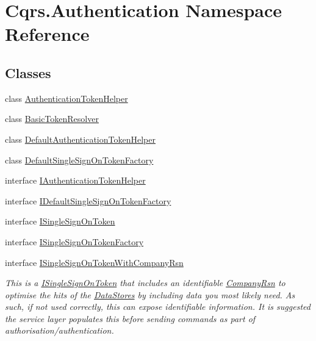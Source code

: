 \hypertarget{namespaceCqrs_1_1Authentication}{}\section{Cqrs.\+Authentication Namespace Reference}
\label{namespaceCqrs_1_1Authentication}
\subsection*{Classes}
\begin{DoxyCompactItemize}
\item 
class \hyperlink{classCqrs_1_1Authentication_1_1AuthenticationTokenHelper}{Authentication\+Token\+Helper}
\item 
class \hyperlink{classCqrs_1_1Authentication_1_1BasicTokenResolver}{Basic\+Token\+Resolver}
\item 
class \hyperlink{classCqrs_1_1Authentication_1_1DefaultAuthenticationTokenHelper}{Default\+Authentication\+Token\+Helper}
\item 
class \hyperlink{classCqrs_1_1Authentication_1_1DefaultSingleSignOnTokenFactory}{Default\+Single\+Sign\+On\+Token\+Factory}
\item 
interface \hyperlink{interfaceCqrs_1_1Authentication_1_1IAuthenticationTokenHelper}{I\+Authentication\+Token\+Helper}
\item 
interface \hyperlink{interfaceCqrs_1_1Authentication_1_1IDefaultSingleSignOnTokenFactory}{I\+Default\+Single\+Sign\+On\+Token\+Factory}
\item 
interface \hyperlink{interfaceCqrs_1_1Authentication_1_1ISingleSignOnToken}{I\+Single\+Sign\+On\+Token}
\item 
interface \hyperlink{interfaceCqrs_1_1Authentication_1_1ISingleSignOnTokenFactory}{I\+Single\+Sign\+On\+Token\+Factory}
\item 
interface \hyperlink{interfaceCqrs_1_1Authentication_1_1ISingleSignOnTokenWithCompanyRsn}{I\+Single\+Sign\+On\+Token\+With\+Company\+Rsn}
\begin{DoxyCompactList}\small\item\em This is a \hyperlink{interfaceCqrs_1_1Authentication_1_1ISingleSignOnToken}{I\+Single\+Sign\+On\+Token} that includes an identifiable \hyperlink{interfaceCqrs_1_1Authentication_1_1ISingleSignOnTokenWithCompanyRsn_a26ffa6ca2e583f0ecc440b68fe3edd52_a26ffa6ca2e583f0ecc440b68fe3edd52}{Company\+Rsn} to optimise the hits of the \hyperlink{}{Data\+Stores} by including data you most likely need. As such, if not used correctly, this can expose identifiable information. It is suggested the service layer populates this before sending commands as part of authorisation/authentication. \end{DoxyCompactList}\item 

\end{DoxyCompactItemize}
